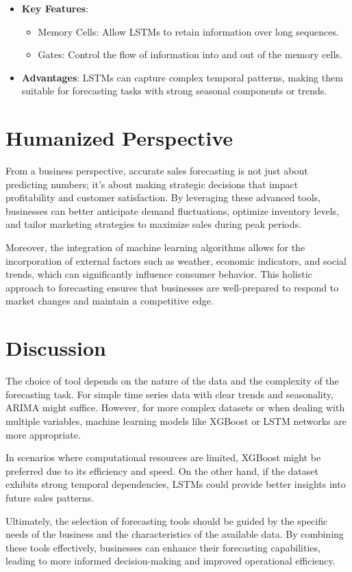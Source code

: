 \documentclass{article}
\begin{document}
\begin{itemize}
    \item \textbf{Key Features}:
    \begin{itemize}
        \item Memory Cells: Allow LSTMs to retain information over long sequences.
        \item Gates: Control the flow of information into and out of the memory cells.
    \end{itemize}
    \item \textbf{Advantages}: LSTMs can capture complex temporal patterns, making them suitable for forecasting tasks with strong seasonal components or trends.
\end{itemize}

\section{Humanized Perspective}
From a business perspective, accurate sales forecasting is not just about predicting numbers; it's about making strategic decisions that impact profitability and customer satisfaction. By leveraging these advanced tools, businesses can better anticipate demand fluctuations, optimize inventory levels, and tailor marketing strategies to maximize sales during peak periods.

Moreover, the integration of machine learning algorithms allows for the incorporation of external factors such as weather, economic indicators, and social trends, which can significantly influence consumer behavior. This holistic approach to forecasting ensures that businesses are well-prepared to respond to market changes and maintain a competitive edge.

\section{Discussion}
The choice of tool depends on the nature of the data and the complexity of the forecasting task. For simple time series data with clear trends and seasonality, ARIMA might suffice. However, for more complex datasets or when dealing with multiple variables, machine learning models like XGBoost or LSTM networks are more appropriate.

In scenarios where computational resources are limited, XGBoost might be preferred due to its efficiency and speed. On the other hand, if the dataset exhibits strong temporal dependencies, LSTMs could provide better insights into future sales patterns.

Ultimately, the selection of forecasting tools should be guided by the specific needs of the business and the characteristics of the available data. By combining these tools effectively, businesses can enhance their forecasting capabilities, leading to more informed decision-making and improved operational efficiency.
\end{document}
